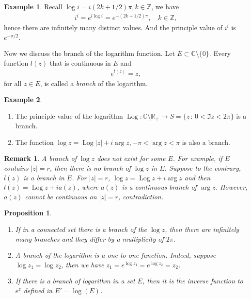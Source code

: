 \documentclass[11pt]{book}
\newtheorem{proposition}{Proposition}[chapter]
\newtheorem{remark}{Remark}[chapter]
\theoremstyle{definition}
\newtheorem{example}{Example}[chapter]
\numberwithin{equation}{chapter}
\begin{document}
\medskip

\begin{example}
Recall $\log i = i(2k + 1/2)\pi, k \in \mathbb{Z}$, we have
\begin{align*}
    i^i = e^{l \log i} = e^{-(2k + 1/2)\pi}, \quad k \in \mathbb{Z},
\end{align*}
hence there are infinitely many distinct values. And the principle value of $i^i$ is $e^{-\pi/2}$.
\end{example}

\medskip

Now we discuss the branch of the logarithm function. Let $E \subset \mathbb{C} \setminus \{0\}$. Every function $l(z)$ that is continuous in $E$ and
\begin{align*}
    e^{l(z)} = z,
\end{align*}
for all $z \in E$, is called a {\it branch} of the logarithm.

\medskip

\begin{example}
~\begin{enumerate}[label=(\alph*)]
    \item The principle value of the logarithm $\operatorname{Log}: \mathbb{C} \setminus \mathbb{R}_+ \to S = \{z \,:\, 0 < \Im z < 2\pi\}$ is a branch.
    
    \item The function $\log z = \operatorname{Log}\left|z\right| + i \arg z, -\pi < \arg z < \pi$ is also a branch.
\end{enumerate}
\end{example}

\begin{remark}
A branch of $\log z$ does not exist for some $E$. For example, if $E$ contains $\left|z\right| = r$, then there is no branch of $\log z$ in $E$. Suppose to the contrary, $l(z)$ is a branch in $E$. For $\left|z\right| = r$, $\log z = \operatorname{Log} z + i \arg z$ and then $l(z) = \operatorname{Log} z + i a(z)$, where $a(z)$ is a continuous branch of $\arg z$. However, $a(z)$ cannot be continuous on $\left|z\right| = r$, contradiction.
\end{remark}

\medskip

\begin{proposition}
~\begin{enumerate}[label=(\alph*)]
    \item If in a connected set there is a branch of the $\log z$, then there are infinitely many branches and they differ by a multiplicity of $2\pi$.
    
    \item A branch of the logarithm is a one-to-one function. Indeed, suppose $\log z_1 = \log z_2$, then we have $z_1 = e^{\log z_1} = e^{\log z_2} = z_2$.
    
    \item If there is a branch of logarithm in a set $E$, then it is the inverse function to $e^z$ defined in $E' = \log(E)$.
\end{enumerate}
\end{proposition}
\end{document}
